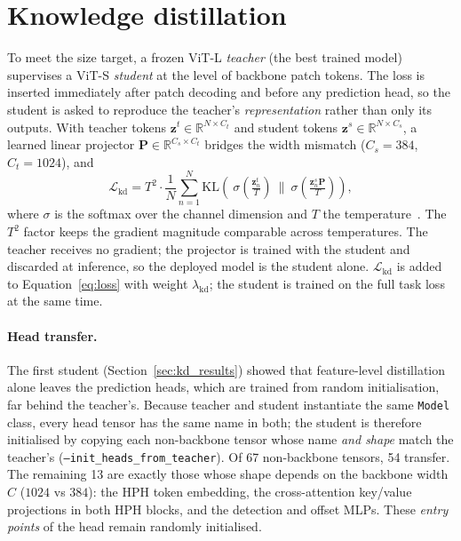 \section{Knowledge distillation}
\label{sec:kd}

To meet the size target, a frozen ViT-L \emph{teacher} (the best trained model)
supervises a ViT-S \emph{student} at the level of backbone patch tokens. The
loss is inserted immediately after patch decoding and before any prediction
head, so the student is asked to reproduce the teacher's \emph{representation}
rather than only its outputs. With teacher tokens
$\mathbf{z}^{t}\in\mathbb{R}^{N\times C_t}$ and student tokens
$\mathbf{z}^{s}\in\mathbb{R}^{N\times C_s}$, a learned linear projector
$\mathbf{P}\in\mathbb{R}^{C_s\times C_t}$ bridges the width mismatch
($C_s{=}384$, $C_t{=}1024$), and
\begin{equation}
\mathcal{L}_{\text{kd}} = T^2\cdot \frac{1}{N}\sum_{n=1}^{N}
  \mathrm{KL}\!\left(\ \sigma\!\left(\tfrac{\mathbf{z}^{t}_n}{T}\right)
  \ \Big\|\ \sigma\!\left(\tfrac{\mathbf{z}^{s}_n\mathbf{P}}{T}\right)\right),
\label{eq:kd}
\end{equation}
where $\sigma$ is the softmax over the channel dimension and $T$ the
temperature~\cite{hinton2015distilling}. The $T^2$ factor keeps the gradient
magnitude comparable across temperatures. The teacher receives no gradient; the
projector is trained with the student and discarded at inference, so the
deployed model is the student alone. $\mathcal{L}_{\text{kd}}$ is added to
Equation~\ref{eq:loss} with weight $\lambda_{\text{kd}}$; the student is trained
on the full task loss at the same time.

\paragraph{Head transfer.} The first student (Section~\ref{sec:kd_results})
showed that feature-level distillation alone leaves the prediction heads, which
are trained from random initialisation, far behind the teacher's. Because
teacher and student instantiate the same \texttt{Model} class, every head
tensor has the same name in both; the student is therefore initialised by
copying each non-backbone tensor whose name \emph{and shape} match the
teacher's (\texttt{--init\_heads\_from\_teacher}). Of 67 non-backbone tensors,
54 transfer. The remaining 13 are exactly those whose shape depends on the
backbone width $C$ ($1024$ vs $384$): the HPH token embedding, the
cross-attention key/value projections in both HPH blocks, and the detection
and offset MLPs. These \emph{entry points} of the head remain randomly
initialised.

